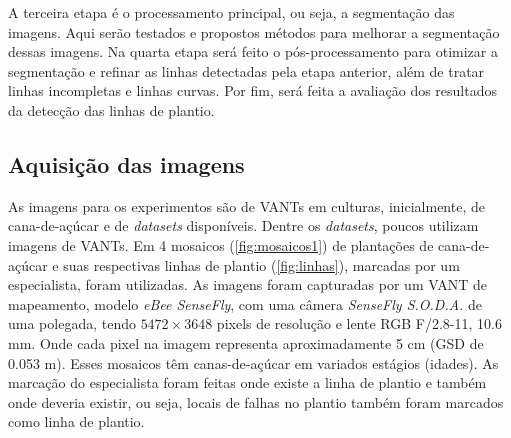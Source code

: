 \documentclass[12pt, a4paper, english, brazil]{article}
\begin{document}
A terceira etapa é o processamento principal, ou seja, a segmentação das imagens. Aqui serão testados e propostos métodos para melhorar a segmentação dessas imagens. Na quarta etapa será feito o pós-processamento para otimizar a segmentação e refinar as linhas detectadas pela etapa anterior, além de tratar linhas incompletas e linhas curvas. Por fim, será feita a avaliação dos resultados da detecção das linhas de plantio.

\subsection{Aquisição das imagens}

As imagens para os experimentos são de VANTs em culturas, inicialmente, de cana-de-açúcar e de \textit{datasets} disponíveis. Dentre os \textit{datasets}, poucos utilizam imagens de VANTs. Em  4 mosaicos (\autoref{fig:mosaicos1}) de plantações de cana-de-açúcar e suas respectivas linhas de plantio (\autoref{fig:linhas}), marcadas por um especialista, foram utilizadas. As imagens foram capturadas por um VANT de mapeamento, modelo \textit{eBee SenseFly}, com uma câmera \textit{SenseFly S.O.D.A.} de uma polegada, tendo $5472\times3648$ pixels de resolução e lente RGB F/2.8-11, 10.6 mm. Onde cada pixel na imagem representa aproximadamente 5 cm (GSD de 0.053 m). Esses mosaicos têm canas-de-açúcar em variados estágios (idades). As marcação do especialista foram feitas onde existe a linha de plantio e também onde deveria existir, ou seja, locais de falhas no plantio também foram marcados como linha de plantio.
\end{document}
